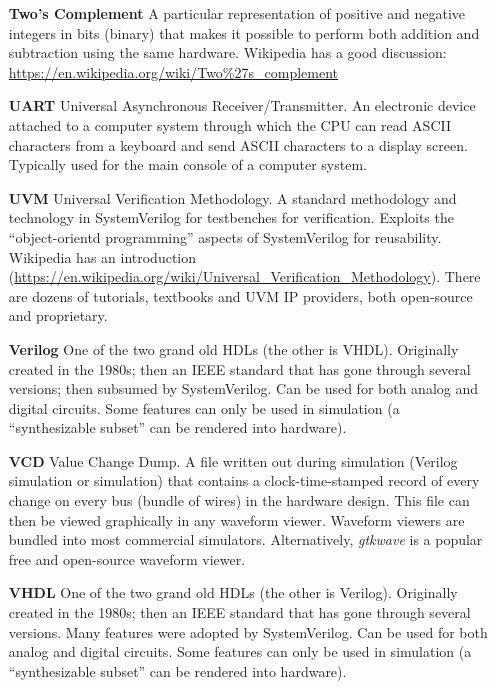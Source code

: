 \begin{itemize}
\item[\bf Two's Complement] A particular representation of positive
  and negative integers in bits (binary) that makes it possible to
  perform both addition and subtraction using the same
  hardware. Wikipedia has a good discussion:
  \url{https://en.wikipedia.org/wiki/Two%27s_complement}

\item[\bf UART] Universal Asynchronous Receiver/Transmitter.  An
  electronic device attached to a computer system through which the
  CPU can read ASCII characters from a keyboard and send ASCII
  characters to a display screen.  Typically used for the main console
  of a computer system.

\item[\bf UVM] Universal Verification Methodology.  A standard
  methodology and technology in SystemVerilog for testbenches for
  verification. Exploits the ``object-orientd programming'' aspects of
  SystemVerilog for reusability. Wikipedia has an introduction
  (\url{https://en.wikipedia.org/wiki/Universal_Verification_Methodology}).
  There are dozens of tutorials, textbooks and UVM IP providers, both
  open-source and proprietary.

\item[\bf Verilog] One of the two grand old HDLs (the other is VHDL).
  Originally created in the 1980s; then an IEEE standard that has gone
  through several versions; then subsumed by SystemVerilog.  Can be
  used for both analog and digital circuits.  Some features can only
  be used in simulation (a ``synthesizable subset'' can be rendered
  into hardware).

\item[\bf VCD] Value Change Dump.  A file written out during
  simulation (Verilog simulation or {\BLUESIM} simulation) that contains
  a clock-time-stamped record of every change on every bus (bundle of
  wires) in the hardware design.  This file can then be viewed
  graphically in any waveform viewer.  Waveform viewers are bundled
  into most commercial simulators. Alternatively, \emph{gtkwave} is a
  popular free and open-source waveform viewer.

\item[\bf VHDL] One of the two grand old HDLs (the other is Verilog).
  Originally created in the 1980s; then an IEEE standard that has gone
  through several versions. Many features were adopted by
  SystemVerilog.  Can be used for both analog and digital circuits.
  Some features can only be used in simulation (a ``synthesizable
  subset'' can be rendered into hardware).

\end{itemize}

